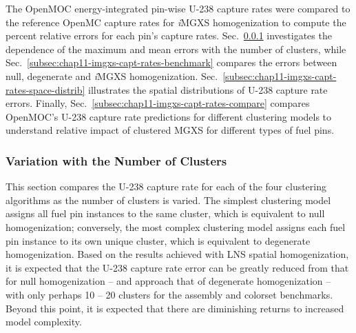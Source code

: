 The OpenMOC energy-integrated pin-wise U-238 capture rates were compared to the reference OpenMC capture rates for \textit{i}\ac{MGXS} homogenization to compute the percent relative errors for each pin's capture rates. Sec.~\ref{subsec:chap11-imgxs-capt-rates-num-clusters} investigates the dependence of the maximum and mean errors with the number of clusters, while Sec.~\ref{subsec:chap11-imgxs-capt-rates-benchmark} compares the errors between null, degenerate and \textit{i}\ac{MGXS} homogenization. Sec.~\ref{subsec:chap11-imgxs-capt-rates-space-distrib} illustrates the spatial distributions of U-238 capture rate errors. Finally, Sec.~\ref{subsec:chap11-imgxs-capt-rates-compare} compares OpenMOC's U-238 capture rate predictions for different clustering models to understand relative impact of clustered \ac{MGXS} for different types of fuel pins.

\subsubsection{Variation with the Number of Clusters}
\label{subsec:chap11-imgxs-capt-rates-num-clusters}

This section compares the U-238 capture rate for each of the four clustering algorithms as the number of clusters is varied. The simplest clustering model assigns all fuel pin instances to the same cluster, which is equivalent to null homogenization; conversely, the most complex clustering model assigns each fuel pin instance to its own unique cluster, which is equivalent to degenerate homogenization. Based on the results achieved with \ac{LNS} spatial homogenization, it is expected that the U-238 capture rate error can be greatly reduced from that for null homogenization -- and approach that of degenerate homogenization -- with only perhaps 10 -- 20 clusters for the assembly and colorset benchmarks. Beyond this point, it is expected that there are diminishing returns to increased model complexity. 

